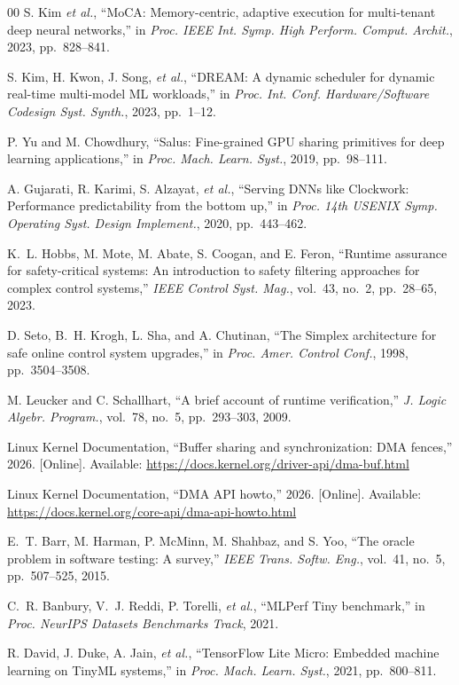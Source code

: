 \documentclass[lettersize,journal]{IEEEtran}
\begin{document}
\begin{thebibliography}{00}
S. Kim \emph{et al.}, ``MoCA: Memory-centric, adaptive execution for
multi-tenant deep neural networks,'' in \emph{Proc. IEEE Int. Symp. High
Perform. Comput. Archit.}, 2023, pp.~828--841.

S. Kim, H. Kwon, J. Song, \emph{et al.}, ``DREAM: A dynamic scheduler for
dynamic real-time multi-model ML workloads,'' in \emph{Proc. Int. Conf.
Hardware/Software Codesign Syst. Synth.}, 2023, pp.~1--12.

P. Yu and M. Chowdhury, ``Salus: Fine-grained GPU sharing primitives for deep
learning applications,'' in \emph{Proc. Mach. Learn. Syst.}, 2019,
pp.~98--111.

A. Gujarati, R. Karimi, S. Alzayat, \emph{et al.}, ``Serving DNNs like
Clockwork: Performance predictability from the bottom up,'' in \emph{Proc.
14th USENIX Symp. Operating Syst. Design Implement.}, 2020, pp.~443--462.

K.~L. Hobbs, M. Mote, M. Abate, S. Coogan, and E. Feron, ``Runtime assurance
for safety-critical systems: An introduction to safety filtering approaches
for complex control systems,'' \emph{IEEE Control Syst. Mag.}, vol.~43, no.~2,
pp.~28--65, 2023.

D. Seto, B.~H. Krogh, L. Sha, and A. Chutinan, ``The Simplex architecture for
safe online control system upgrades,'' in \emph{Proc. Amer. Control Conf.},
1998, pp.~3504--3508.

M. Leucker and C. Schallhart, ``A brief account of runtime verification,''
\emph{J. Logic Algebr. Program.}, vol.~78, no.~5, pp.~293--303, 2009.

Linux Kernel Documentation, ``Buffer sharing and synchronization: DMA
fences,'' 2026. [Online]. Available:
\url{https://docs.kernel.org/driver-api/dma-buf.html}

Linux Kernel Documentation, ``DMA API howto,'' 2026. [Online]. Available:
\url{https://docs.kernel.org/core-api/dma-api-howto.html}

E.~T. Barr, M. Harman, P. McMinn, M. Shahbaz, and S. Yoo, ``The oracle problem
in software testing: A survey,'' \emph{IEEE Trans. Softw. Eng.}, vol.~41,
no.~5, pp.~507--525, 2015.

C.~R. Banbury, V.~J. Reddi, P. Torelli, \emph{et al.}, ``MLPerf Tiny
benchmark,'' in \emph{Proc. NeurIPS Datasets Benchmarks Track}, 2021.

R. David, J. Duke, A. Jain, \emph{et al.}, ``TensorFlow Lite Micro: Embedded
machine learning on TinyML systems,'' in \emph{Proc. Mach. Learn. Syst.},
2021, pp.~800--811.

\end{thebibliography}
\end{document}
